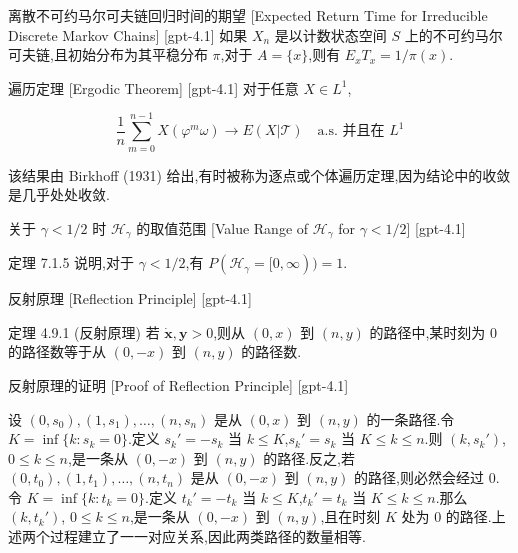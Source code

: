 \documentclass[UTF8]{ctexart}
\begin{document}
    
    
    \begin{thm}
        {离散不可约马尔可夫链回归时间的期望}
        [Expected Return Time for Irreducible Discrete Markov Chains]
        [gpt-4.1]
        如果 $X_n$ 是以计数状态空间 $S$ 上的不可约马尔可夫链,且初始分布为其平稳分布 $\pi$,对于 $A = \{x\}$,则有 $E_{x} T_{x} = 1/\pi(x)$.
    \end{thm}
    
    
    
    \begin{thm}
        {遍历定理}
        [Ergodic Theorem]
        [gpt-4.1]
        对于任意 $X \in L^1$,

\[
\frac{1}{n} \sum_{m=0}^{n-1} X(\varphi^m \omega) \to E(X | \mathcal{T}) \quad \text{a.s. 并且在 } L^1
\]

该结果由 Birkhoff (1931) 给出,有时被称为逐点或个体遍历定理,因为结论中的收敛是几乎处处收敛.

    \end{thm}
    
    
    
    \begin{thm}
        {关于 $\gamma < 1/2$ 时 $\mathcal{H}_\gamma$ 的取值范围}
        [Value Range of $\mathcal{H}_\gamma$ for $\gamma < 1/2$]
        [gpt-4.1]
        
定理 7.1.5 说明,对于 $\gamma < 1/2$,有 $P(\mathcal{H}_\gamma = [0, \infty)) = 1$.

    \end{thm}
    
    
    
    \begin{thm}
        {反射原理}
        [Reflection Principle]
        [gpt-4.1]
        
定理 4.9.1 (反射原理) 若 $\dot{\boldsymbol{x}}, \boldsymbol{y} > 0$,则从 $(0, x)$ 到 $(n, y)$ 的路径中,某时刻为 $0$ 的路径数等于从 $(0, -x)$ 到 $(n, y)$ 的路径数.

    \end{thm}
    
    
    
    \begin{prf}
        {反射原理的证明}
        [Proof of Reflection Principle]
        [gpt-4.1]
        
设 $(0, s_0), (1, s_1), \ldots, (n, s_n)$ 是从 $(0, x)$ 到 $(n, y)$ 的一条路径.令 $K = \operatorname{inf} \{ k : s_k = 0 \}$.定义 $s_k' = -s_k$ 当 $k \leq K$,$s_k' = s_k$ 当 $K \leq k \leq n$.则 $(k, s_k')$, $0 \leq k \leq n$,是一条从 $(0, -x)$ 到 $(n, y)$ 的路径.反之,若 $(0, t_0), (1, t_1), \ldots, (n, t_n)$ 是从 $(0, -x)$ 到 $(n, y)$ 的路径,则必然会经过 0.令 $K = \operatorname{inf} \{ k : t_k = 0 \}$.定义 $t_k' = -t_k$ 当 $k \leq K$,$t_k' = t_k$ 当 $K \leq k \leq n$.那么 $(k, t_k')$, $0 \leq k \leq n$,是一条从 $(0, -x)$ 到 $(n, y)$,且在时刻 $K$ 处为 0 的路径.上述两个过程建立了一一对应关系,因此两类路径的数量相等.

    \end{prf}
    
\end{document}
